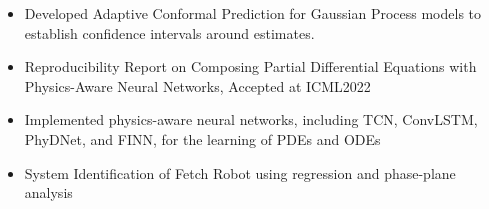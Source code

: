 \documentclass[10pt,a4paper,ragged2e,withhyper]{altacv}
\begin{document}

\begin{itemize}
    \item Developed Adaptive Conformal Prediction for Gaussian Process models to establish confidence intervals around estimates.
\end{itemize}


\begin{itemize}
    \item Reproducibility Report on Composing Partial Differential Equations with Physics-Aware Neural Networks, Accepted at ICML2022
    \item Implemented physics-aware neural networks, including TCN, ConvLSTM, PhyDNet, and FINN, for the learning of PDEs and ODEs
\end{itemize}


\begin{itemize}
    \item System Identification of Fetch Robot using regression and phase-plane analysis
\end{itemize}



\end{document}
